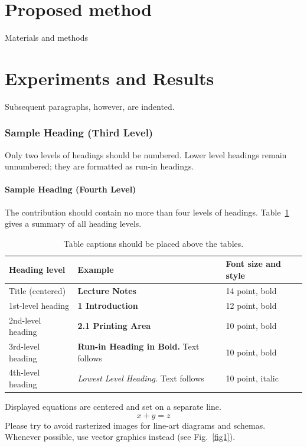 \documentclass[runningheads]{llncs}
\begin{document}
\section{Proposed method}
Materials and methods

\section{Experiments and Results}
Subsequent paragraphs, however, are indented.

\subsubsection{Sample Heading (Third Level)} Only two levels of
headings should be numbered. Lower level headings remain unnumbered;
they are formatted as run-in headings.

\paragraph{Sample Heading (Fourth Level)}
The contribution should contain no more than four levels of
headings. Table~\ref{tab1} gives a summary of all heading levels.

\begin{table}
\caption{Table captions should be placed above the
tables.}\label{tab1}
\begin{tabular}{|l|l|l|}
\hline
Heading level &  Example & Font size and style\\
\hline
Title (centered) &  {\Large\bfseries Lecture Notes} & 14 point, bold\\
1st-level heading &  {\large\bfseries 1 Introduction} & 12 point, bold\\
2nd-level heading & {\bfseries 2.1 Printing Area} & 10 point, bold\\
3rd-level heading & {\bfseries Run-in Heading in Bold.} Text follows & 10 point, bold\\
4th-level heading & {\itshape Lowest Level Heading.} Text follows & 10 point, italic\\
\hline
\end{tabular}
\end{table}


\noindent Displayed equations are centered and set on a separate
line.
\begin{equation}
x + y = z
\end{equation}
Please try to avoid rasterized images for line-art diagrams and
schemas. Whenever possible, use vector graphics instead (see
Fig.~\ref{fig1}).
\end{document}

